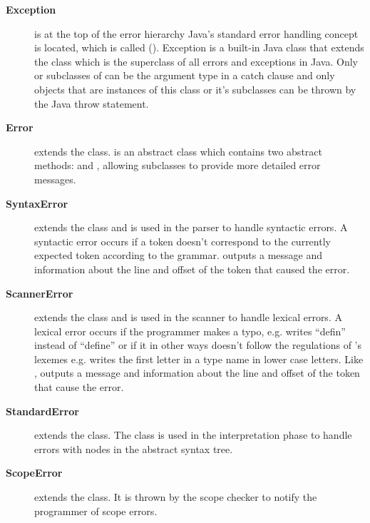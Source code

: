 \begin{description}
\item[\textbf{Exception}] is at the top of the error hierarchy Java's standard
  error handling concept is located, which is called 
  (). Exception is a built-in Java class that
  extends the  class which is the superclass of all errors
  and exceptions in Java. Only  or subclasses of
   can be the argument type in a catch clause and only
  objects that are instances of this class or it's subclasses can be thrown by
  the Java throw statement.
  \cite{throwable}

\item[\textbf{Error}] extends the  class.
   is an abstract class which contains two abstract
  methods:  and , allowing
  subclasses to provide more detailed error messages.

\item[\textbf{SyntaxError}] extends the  class and is used in
  the parser to handle syntactic errors. A syntactic error occurs if a token
  doesn't correspond to the currently expected token according to the grammar.
   outputs a message and information about the line and
  offset of the token that caused the error. 

\item[\textbf{ScannerError}] extends the  class and is
  used in the scanner to handle lexical errors. A lexical error occurs if the
  programmer makes a typo, e.g. writes ``defin'' instead of ``define'' or if it 
  in other ways doesn't follow the regulations of \productname{}'s lexemes e.g.
  writes the first letter in a type name in lower case letters. Like
  ,  outputs a message and
  information about the line and offset of the token that cause the error.  

\item[\textbf{StandardError}] extends the  class. The
   class is used in the interpretation phase to handle
  errors with nodes in the abstract syntax tree.  

\item[\textbf{ScopeError}] extends the  class. It is
  thrown by the scope checker to notify the programmer of scope errors.


\end{description}
